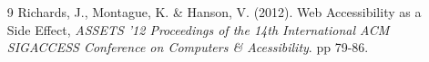 \documentclass{acm_proc_article-sp}
\begin{document}
\begin{itemize}
\item[9] Richards, J., Montague, K. \& Hanson, V. (2012). Web Accessibility as a Side Effect, {\it ASSETS '12 Proceedings of the 14th International ACM SIGACCESS Conference on Computers \& Acessibility}. pp 79-86.
\end{itemize}
%

%
%
\balancecolumns
\end{document}
